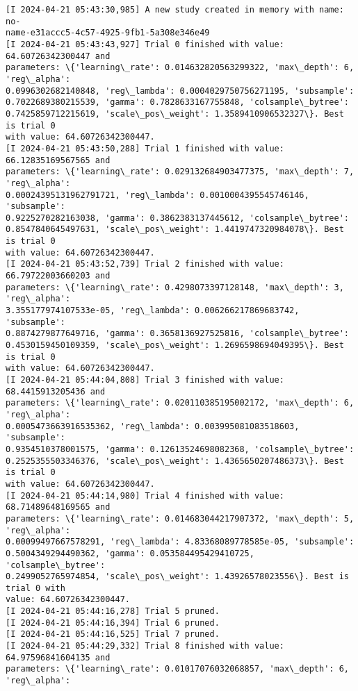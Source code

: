 \documentclass[11pt]{article}
\begin{document}
    \begin{Verbatim}[commandchars=\\\{\}]
[I 2024-04-21 05:43:30,985] A new study created in memory with name: no-
name-e31accc5-4c57-4925-9fb1-5a308e346e49
[I 2024-04-21 05:43:43,927] Trial 0 finished with value: 64.60726342300447 and
parameters: \{'learning\_rate': 0.014632820563299322, 'max\_depth': 6, 'reg\_alpha':
0.0996302682140848, 'reg\_lambda': 0.0004029750756271195, 'subsample':
0.7022689380215539, 'gamma': 0.7828633167755848, 'colsample\_bytree':
0.7425859712215619, 'scale\_pos\_weight': 1.3589410906532327\}. Best is trial 0
with value: 64.60726342300447.
[I 2024-04-21 05:43:50,288] Trial 1 finished with value: 66.12835169567565 and
parameters: \{'learning\_rate': 0.029132684903477375, 'max\_depth': 7, 'reg\_alpha':
0.00024395131962791721, 'reg\_lambda': 0.0010004395545746146, 'subsample':
0.9225270282163038, 'gamma': 0.3862383137445612, 'colsample\_bytree':
0.8547840645497631, 'scale\_pos\_weight': 1.4419747320984078\}. Best is trial 0
with value: 64.60726342300447.
[I 2024-04-21 05:43:52,739] Trial 2 finished with value: 66.79722003660203 and
parameters: \{'learning\_rate': 0.4298073397128148, 'max\_depth': 3, 'reg\_alpha':
3.355177974107533e-05, 'reg\_lambda': 0.006266217869683742, 'subsample':
0.8874279877649716, 'gamma': 0.3658136927525816, 'colsample\_bytree':
0.4530159450109359, 'scale\_pos\_weight': 1.2696598694049395\}. Best is trial 0
with value: 64.60726342300447.
[I 2024-04-21 05:44:04,808] Trial 3 finished with value: 68.4415913205436 and
parameters: \{'learning\_rate': 0.020110385195002172, 'max\_depth': 6, 'reg\_alpha':
0.0005473663916535362, 'reg\_lambda': 0.003995081083518603, 'subsample':
0.9354510378001575, 'gamma': 0.12613524698082368, 'colsample\_bytree':
0.2525355503346376, 'scale\_pos\_weight': 1.4365650207486373\}. Best is trial 0
with value: 64.60726342300447.
[I 2024-04-21 05:44:14,980] Trial 4 finished with value: 68.71489648169565 and
parameters: \{'learning\_rate': 0.014683044217907372, 'max\_depth': 5, 'reg\_alpha':
0.00099497667578291, 'reg\_lambda': 4.83368089778585e-05, 'subsample':
0.5004349294490362, 'gamma': 0.053584495429410725, 'colsample\_bytree':
0.2499052765974854, 'scale\_pos\_weight': 1.43926578023556\}. Best is trial 0 with
value: 64.60726342300447.
[I 2024-04-21 05:44:16,278] Trial 5 pruned.
[I 2024-04-21 05:44:16,394] Trial 6 pruned.
[I 2024-04-21 05:44:16,525] Trial 7 pruned.
[I 2024-04-21 05:44:29,332] Trial 8 finished with value: 64.97596841604135 and
parameters: \{'learning\_rate': 0.01017076032068857, 'max\_depth': 6, 'reg\_alpha':

\end{Verbatim}
\end{document}
